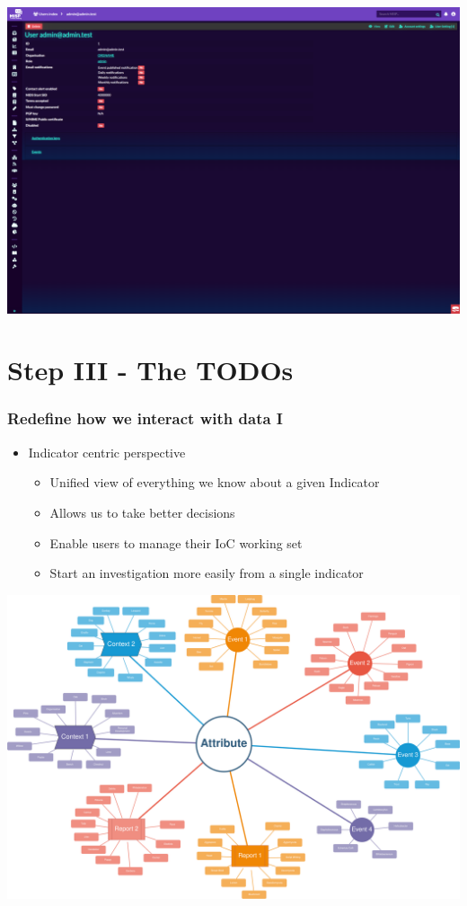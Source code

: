 \begin{frame}
\begin{minipage}{0.5\textwidth}
        \vspace{1em}
        \includegraphics[width=0.9\linewidth]{pictures/theme4.png}
    \end{minipage}
\end{frame}


\section{Step III - The TODOs}
\begin{frame}
    \frametitle{Redefine how we interact with data I}
    \begin{itemize}
        \item Indicator centric perspective
        \begin{itemize}
            \item Unified view of everything we know about a given Indicator
            \item Allows us to take better decisions
            \item Enable users to manage their IoC working set
            \item Start an investigation more easily from a single indicator
        \end{itemize}
    \end{itemize}
    \begin{center}
        \includegraphics[width=0.7\linewidth]{pictures/attribute-centric.png}
    \end{center}
\end{frame}


